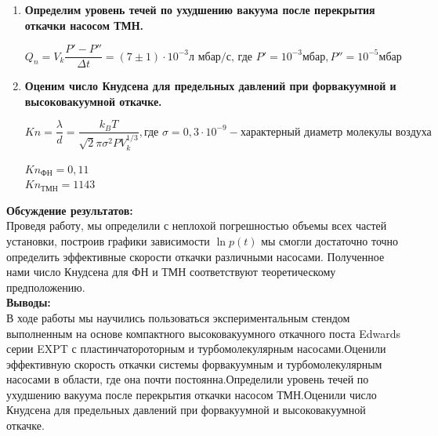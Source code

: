 \documentclass[a4paper, 12pt]{article}%
\begin{document}
\begin{enumerate}
	\item \textbf{Определим уровень течей по ухудшению вакуума после перекрытия откачки насосом ТМН.}
	
	
	$$ Q_n = V_k \frac{P' - P''}{\Delta t} = (7 \pm 1)\cdot 10^{-3} \text{л мбар/с,     где  } P' = 10^{-3}\text{мбар}, P'' = 10^{-5} \text{мбар}$$
	
	
	
	\begin{figure}[h]
	\end{figure}
	
	
	\item \textbf{Оценим число Кнудсена для предельных давлений при форвакуумной и высоковакуумной откачке.}
	
	$$ Kn = \frac{\lambda}{d} = \frac{k_B T}{\sqrt 2 \pi \sigma^2 P V_k^{1/3}}, \text{где } \sigma = 0,3 \cdot 10^{-9} - \text{характерный диаметр молекулы воздуха}$$
	
	
	$Kn_{\text{ФН}} = 0,11 $\\
	
	
	$Kn_{\text{ТМН}} = 1143 $
	\end{enumerate}


	\textbf{Обсуждение результатов: }\\
	
	
	Проведя работу, мы определили с неплохой погрешностью объемы всех частей установки, построив графики зависимости $\ln p(t)$ мы смогли достаточно точно определить эффективные скорости откачки различными насосами. Полученное нами число Кнудсена для ФН и ТМН соответствуют теоретическому предположению.\\
	
	
	
	\textbf{Выводы: }\\
	
	
	В ходе работы мы научились пользоваться экспериментальным стендом выполненным на основе компактного высоковакуумного откачного поста Edwards серии EXPT с пластинчатороторным и турбомолекулярным насосами.Оценили эффективную скорость откачки системы форвакуумным  и турбомолекулярным насосами в области, где она почти постоянна.Определили уровень течей по ухудшению вакуума после перекрытия откачки насосом ТМН.Оценили число Кнудсена для предельных давлений при форвакуумной и высоковакуумной откачке.
	
	
	
\end{document}

